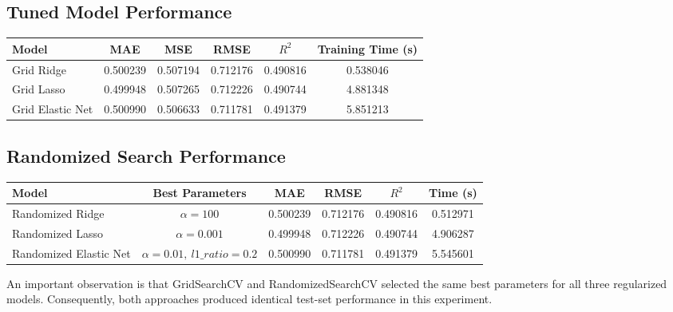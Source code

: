 \documentclass[12pt,a4paper]{article}
\begin{document}
\subsection{Tuned Model Performance}

\begin{longtable}{|p{4cm}|c|c|c|c|c|}
\hline
\textbf{Model} &
\textbf{MAE} &
\textbf{MSE} &
\textbf{RMSE} &
\textbf{$R^2$} &
\textbf{Training Time (s)}
\\ \hline

Grid Ridge &
0.500239 &
0.507194 &
0.712176 &
0.490816 &
0.538046
\\ \hline

Grid Lasso &
0.499948 &
0.507265 &
0.712226 &
0.490744 &
4.881348
\\ \hline

Grid Elastic Net &
0.500990 &
0.506633 &
0.711781 &
0.491379 &
5.851213
\\ \hline

\end{longtable}

\subsection{Randomized Search Performance}

\begin{longtable}{|p{4cm}|c|c|c|c|c|}
\hline
\textbf{Model} &
\textbf{Best Parameters} &
\textbf{MAE} &
\textbf{RMSE} &
\textbf{$R^2$} &
\textbf{Time (s)}
\\ \hline

Randomized Ridge &
$\alpha=100$ &
0.500239 &
0.712176 &
0.490816 &
0.512971
\\ \hline

Randomized Lasso &
$\alpha=0.001$ &
0.499948 &
0.712226 &
0.490744 &
4.906287
\\ \hline

Randomized Elastic Net &
$\alpha=0.01,\ l1\_ratio=0.2$ &
0.500990 &
0.711781 &
0.491379 &
5.545601
\\ \hline

\end{longtable}

An important observation is that GridSearchCV and RandomizedSearchCV
selected the same best parameters for all three regularized models.
Consequently, both approaches produced identical test-set performance in
this experiment.

\end{document}
